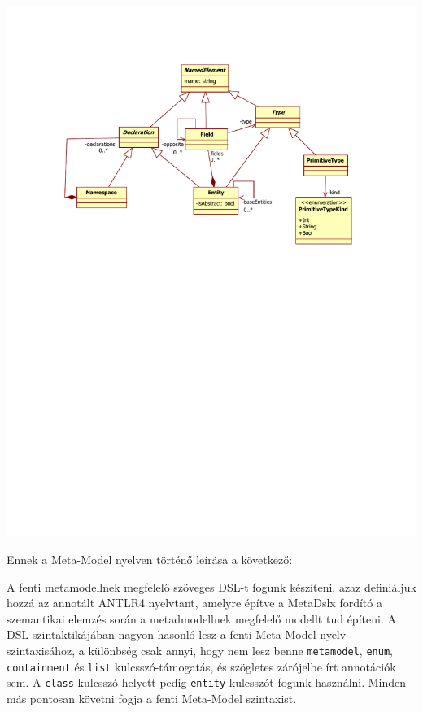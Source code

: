 \documentclass[12pt, a4paper]{report}
\newcommand{\f}[1]{\texttt{#1}}
\begin{document}
\begin{center}\includegraphics[trim=60 430 60 80,clip,width=\textwidth]{SampleMetaModel.pdf}\end{center}

Ennek a Meta-Model nyelven történő leírása a következő:



A fenti metamodellnek megfelelő szöveges DSL-t fogunk készíteni, azaz definiáljuk hozzá az annotált ANTLR4 nyelvtant, amelyre építve a MetaDslx fordító a szemantikai elemzés során a metadmodellnek megfelelő modellt tud építeni. A DSL szintaktikájában nagyon hasonló lesz a fenti Meta-Model nyelv szintaxisához, a különbség csak annyi, hogy nem lesz benne \f{metamodel}, \f{enum}, \f{containment} és \f{list} kulcsszó-támogatás, és szögletes zárójelbe írt annotációk sem. A \f{class} kulcsszó helyett pedig \f{entity} kulcsszót fogunk használni. Minden más pontosan követni fogja a fenti Meta-Model szintaxist.
\end{document}
